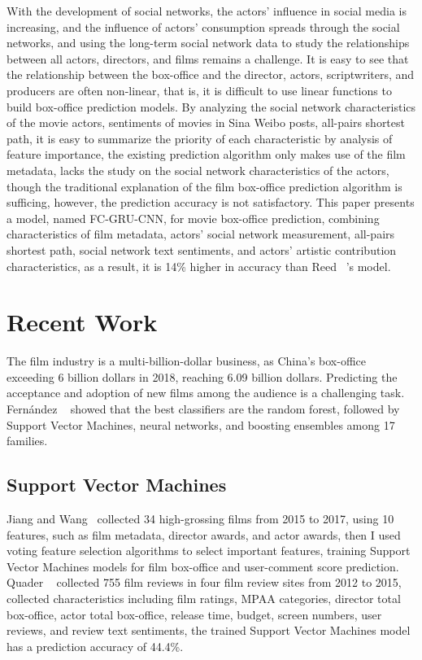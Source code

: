 \documentclass[review]{cvpr}
\begin{document}
  With the development of social networks, the actors' influence in social media is increasing,
  and the influence of actors' consumption spreads through the social networks,
  and using the long-term social network data to study the relationships between all actors, directors, and films remains a challenge.
  It is easy to see that the relationship between the box-office and the director, actors, scriptwriters, and producers are often non-linear, that is,
  it is difficult to use linear functions to build box-office prediction models.
  By analyzing the social network characteristics of the movie actors, sentiments of movies in Sina Weibo posts, all-pairs shortest path,
  it is easy to summarize the priority of each characteristic by analysis of feature importance,
  the existing prediction algorithm only makes use of the film metadata, lacks the study on the social network characteristics of the actors,
  though the traditional explanation of the film box-office prediction algorithm is sufficing, however, the prediction accuracy is not satisfactory.
  This paper presents a model, named FC-GRU-CNN, for movie box-office prediction, combining characteristics of film metadata, actors' social network measurement,
  all-pairs shortest path, social network text sentiments, and actors' artistic contribution characteristics,
  as a result, it is 14\% higher in accuracy than Reed \etal~\cite{reed2016learning}'s model.


\section{Recent Work}

  The film industry is a multi-billion-dollar business, as China's box-office exceeding 6 billion dollars in 2018, reaching 6.09 billion dollars.
  Predicting the acceptance and adoption of new films among the audience is a challenging task.
  Fern{\'a}ndez \etal ~\cite{fernandez2014we} showed that the best classifiers are the random forest,
  followed by Support Vector Machines, neural networks, and boosting ensembles among 17 families.


\subsection{Support Vector Machines}

  Jiang and Wang~\cite{jiang2018predicting} collected 34 high-grossing films from 2015 to 2017, using 10 features, such as film metadata, director awards, and actor awards, then I used voting feature selection algorithms to select important features,
  training Support Vector Machines models for film box-office and user-comment score prediction.
  Quader \etal~\cite{quader2017machine} collected 755 film reviews in four film review sites from 2012 to 2015, collected characteristics including film ratings, MPAA categories,
  director total box-office, actor total box-office, release time, budget, screen numbers, user reviews, and review text sentiments,
  the trained Support Vector Machines model has a prediction accuracy of 44.4\%.
\end{document}
